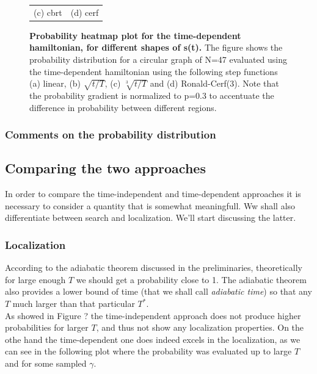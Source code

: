 \documentclass[11pt, twoside]{report}
\begin{document}
\begin{figure}[ht]
\begin{tabular}{cc}
(c) cbrt & (d) cerf\\[6pt]
\end{tabular}
\caption[Probability heatmap plot for the time-dependent hamiltonian, for different shapes of s(t)]{\textbf{Probability heatmap plot for the time-dependent hamiltonian, for different shapes of s(t).} The figure shows the probability distribution for a circular graph of N=47 evaluated using the time-dependent hamiltonian using the following step functions (a) linear, (b) $\sqrt{t/T}$, (c) $\sqrt[3]{t/T}$ and (d) Ronald-Cerf(3). Note that the probability gradient is normalized to p=0.3 to accentuate the difference in probability between different regions. }
\end{figure}

\subsubsection*{Comments on the probability distribution}
\subsection{Comparing the two approaches}
In order to compare the time-independent and time-dependent approaches it is necessary to consider a quantity that is somewhat meaningfull. Ww shall also differentiate between search and localization. We'll start discussing the latter.

\subsubsection*{Localization}
According to the adiabatic theorem discussed in the preliminaries, theoretically for large enough $T$ we should get a probability close to 1. The adiabatic theorem also provides a lower bound of time (that we shall call \textit{adiabatic time}) so that any $T$ much larger than that particular $T^*$. \\
As showed in Figure ? the time-independent approach does not produce higher probabilities for larger $T$, and thus not show any localization properties. On the othe hand the time-dependent one does indeed excels in the localization, as we can see in the following plot where the probability was evaluated up to large $T$ and for some sampled $\gamma$.
\end{document}
